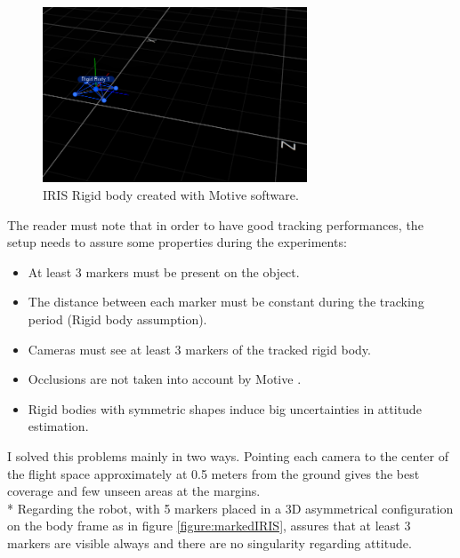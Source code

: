 \begin{figure}[h]
\centering
 \includegraphics[width=0.7\textwidth]{motiv_iris.PNG}
 \caption[IRIS Rigid body]{IRIS Rigid body created with Motive software.}
 \label{figure:motivescreen}
\end{figure}
The reader must note that in order to have good tracking performances, the setup needs to assure some properties during the experiments:

\begin{itemize}
\item At least 3 markers must be present on the object.
\item The distance between each marker must be constant during the tracking period (Rigid body assumption).
\item Cameras must see at least 3 markers of the tracked rigid body.
\item Occlusions are not taken into account by Motive \cite{OptiT}.
\item Rigid bodies with symmetric shapes induce big uncertainties in attitude estimation.
\end{itemize}
I solved this problems mainly in two ways. Pointing each camera to the center of the flight space approximately at 0.5 meters from the ground gives the best coverage and few unseen areas at the margins.\\*
Regarding the robot, with 5 markers placed in a 3D asymmetrical configuration  on the body frame as in figure \ref{figure:markedIRIS}, assures that at least 3 markers are visible always and there are no singularity regarding attitude.

